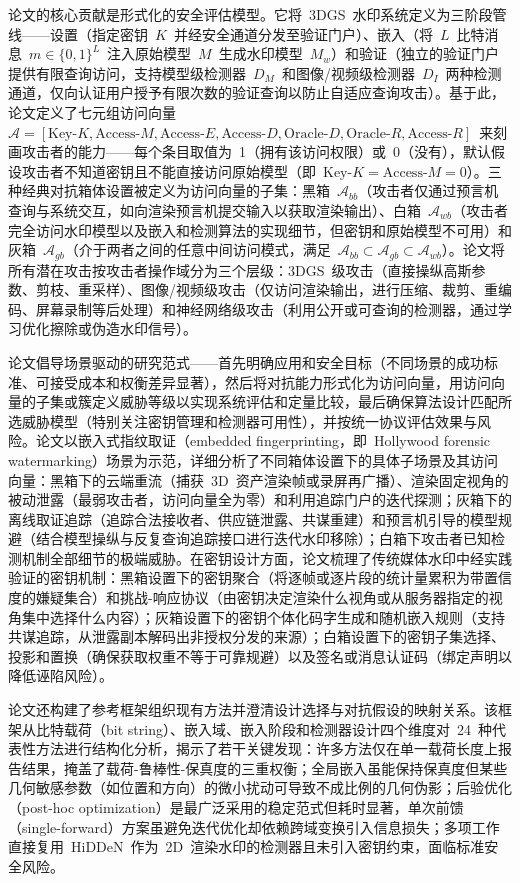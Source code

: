 论文的核心贡献是形式化的安全评估模型。它将~3DGS~水印系统定义为三阶段管线——设置（指定密钥~$K$~并经安全通道分发至验证门户）、嵌入（将~$L$~比特消息~$m \in \{0,1\}^L$~注入原始模型~$M$~生成水印模型~$M_w$）和验证（独立的验证门户提供有限查询访问，支持模型级检测器~$D_M$~和图像/视频级检测器~$D_I$~两种检测通道，仅向认证用户授予有限次数的验证查询以防止自适应查询攻击）。基于此，论文定义了七元组访问向量~$\mathcal{A} = [\text{Key-}K, \text{Access-}M, \text{Access-}E, \text{Access-}D, \text{Oracle-}D, \text{Oracle-}R, \text{Access-}R]$~来刻画攻击者的能力——每个条目取值为~1（拥有该访问权限）或~0（没有），默认假设攻击者不知道密钥且不能直接访问原始模型（即~$\text{Key-}K = \text{Access-}M = 0$）。三种经典对抗箱体设置被定义为访问向量的子集：黑箱~$\mathcal{A}_{bb}$（攻击者仅通过预言机查询与系统交互，如向渲染预言机提交输入以获取渲染输出）、白箱~$\mathcal{A}_{wb}$（攻击者完全访问水印模型以及嵌入和检测算法的实现细节，但密钥和原始模型不可用）和灰箱~$\mathcal{A}_{gb}$（介于两者之间的任意中间访问模式，满足~$\mathcal{A}_{bb} \subset \mathcal{A}_{gb} \subset \mathcal{A}_{wb}$）。论文将所有潜在攻击按攻击者操作域分为三个层级：3DGS~级攻击（直接操纵高斯参数、剪枝、重采样）、图像/视频级攻击（仅访问渲染输出，进行压缩、裁剪、重编码、屏幕录制等后处理）和神经网络级攻击（利用公开或可查询的检测器，通过学习优化擦除或伪造水印信号）。

论文倡导场景驱动的研究范式——首先明确应用和安全目标（不同场景的成功标准、可接受成本和权衡差异显著），然后将对抗能力形式化为访问向量，用访问向量的子集或簇定义威胁等级以实现系统评估和定量比较，最后确保算法设计匹配所选威胁模型（特别关注密钥管理和检测器可用性），并按统一协议评估效果与风险。论文以嵌入式指纹取证（embedded fingerprinting，即~Hollywood forensic watermarking）场景为示范，详细分析了不同箱体设置下的具体子场景及其访问向量：黑箱下的云端重流（捕获~3D~资产渲染帧或录屏再广播）、渲染固定视角的被动泄露（最弱攻击者，访问向量全为零）和利用追踪门户的迭代探测；灰箱下的离线取证追踪（追踪合法接收者、供应链泄露、共谋重建）和预言机引导的模型规避（结合模型操纵与反复查询追踪接口进行迭代水印移除）；白箱下攻击者已知检测机制全部细节的极端威胁。在密钥设计方面，论文梳理了传统媒体水印中经实践验证的密钥机制：黑箱设置下的密钥聚合（将逐帧或逐片段的统计量累积为带置信度的嫌疑集合）和挑战-响应协议（由密钥决定渲染什么视角或从服务器指定的视角集中选择什么内容）；灰箱设置下的密钥个体化码字生成和随机嵌入规则（支持共谋追踪，从泄露副本解码出非授权分发的来源）；白箱设置下的密钥子集选择、投影和置换（确保获取权重不等于可靠规避）以及签名或消息认证码（绑定声明以降低诬陷风险）。

论文还构建了参考框架组织现有方法并澄清设计选择与对抗假设的映射关系。该框架从比特载荷（bit string）、嵌入域、嵌入阶段和检测器设计四个维度对~24~种代表性方法进行结构化分析，揭示了若干关键发现：许多方法仅在单一载荷长度上报告结果，掩盖了载荷-鲁棒性-保真度的三重权衡；全局嵌入虽能保持保真度但某些几何敏感参数（如位置和方向）的微小扰动可导致不成比例的几何伪影；后验优化（post-hoc optimization）是最广泛采用的稳定范式但耗时显著，单次前馈（single-forward）方案虽避免迭代优化却依赖跨域变换引入信息损失；多项工作直接复用~HiDDeN~作为~2D~渲染水印的检测器且未引入密钥约束，面临标准安全风险。

